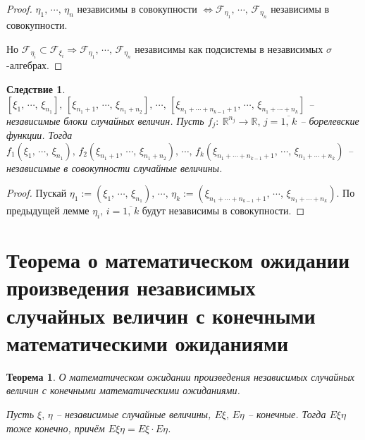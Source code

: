 \documentclass[a4paper,12pt]{article}
\theoremstyle{plain}
\newtheorem{theorem}{Теорема}[section]
\newtheorem*{corollary}{Следствие}
\theoremstyle{definition}
\theoremstyle{remark}
\begin{document}
\begin{proof}
	$\eta_1,\,\cdots,\,\eta_n$ независимы в совокупности $\Leftrightarrow \mathcal{F}_{\eta_1},\,\cdots,\,\mathcal{F}_{\eta_n}$ независимы в совокупности.

	Но $\mathcal{F}_{\eta_i} \subset \mathcal{F}_{\xi_i} \Rightarrow \mathcal{F}_{\eta_1},\,\cdots,\,\mathcal{F}_{\eta_n}$ независимы как подсистемы в независимых $\sigma$-алгебрах.
\end{proof}

\begin{corollary}
	$[\xi_1,\,\cdots,\,\xi_{n_1}],\, [\xi_{n_1 + 1},\,\cdots,\,\xi_{n_1 + n_2}],\,\cdots,\, [\xi_{n_1 + \cdots + n_{k - 1} + 1},\,\cdots,\, \xi_{n_1 + \cdots + n_k}]$ -- независимые блоки случайных величин. Пусть $f_j :\: \mathbb{R}^{n_j} \to \mathbb{R},\, j = \overline{1,\,k}$ -- борелевские функции. Тогда $f_1(\xi_1,\,\cdots,\,\xi_{n_1}),\, f_2(\xi_{n_1 + 1},\,\cdots,\,\xi_{n_1 + n_2}),\,\cdots,\, f_k(\xi_{n_1 + \cdots + n_{k - 1} + 1},\,\cdots,\, \xi_{n_1 + \cdots + n_k})$ -- независимые в совокупности случайные величины.
\end{corollary}

\begin{proof}
	Пускай $\eta_1 := (\xi_1,\,\cdots,\,\xi_{n_1}),\, \cdots,\, \eta_k := (\xi_{n_1 + \cdots + n_{k - 1} + 1},\,\cdots,\, \xi_{n_1 + \cdots + n_k})$. По предыдущей лемме $\eta_i,\, i = \overline{1,\,k}$ будут независимы в совокупности.
\end{proof}

\section{Теорема о математическом ожидании произведения независимых случайных величин с конечными математическими ожиданиями}
\begin{theorem}
	О математическом ожидании произведения независимых случайных величин с конечными математическими ожиданиями.

	Пусть $\xi,\, \eta$ -- независимые случайные величины, $E\xi,\, E\eta$ -- конечные. Тогда $E\xi\eta$ тоже конечно, причём $E\xi\eta = E\xi\cdot E\eta$.
\end{theorem}
\end{document}
